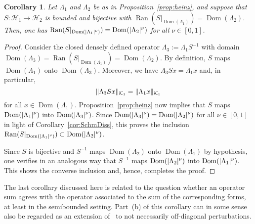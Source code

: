 \documentclass[11pt,a4paper]{amsart}
\numberwithin{equation}{section}
\DeclareMathOperator{\Ran}{Ran}
\DeclareMathOperator{\Dom}{Dom}
\DeclarePairedDelimiter{\abs}{|}{|}
\DeclarePairedDelimiter{\norm}{\lVert}{\rVert}
\newcommand{\cH}{{\mathcal H}}
\newcommand{\cK}{{\mathcal K}}
\theoremstyle{plain}
\newtheorem{corollary}[theorem]{Corollary}
\theoremstyle{definition}
\theoremstyle{remark}
\begin{document}
\begin{corollary}\label{cor:fracBij}
  Let $\Lambda_1$ and $\Lambda_2$ be as in Proposition~\ref{prop:heinz}, and suppose that $S\colon\cH_1\to\cH_2$ is bounded and
  bijective with $\Ran(S|_{\Dom(\Lambda_1)})=\Dom(\Lambda_2)$. Then, one has
  $\Ran(S|_{\Dom(\abs{\Lambda_1}^\nu)})=\Dom(\abs{\Lambda_2}^\nu)$ for all $\nu\in[0,1]$.
\end{corollary}

\begin{proof}
  Consider the closed densely defined operator $\Lambda_3 := \Lambda_1S^{-1}$ with domain
  $\Dom(\Lambda_3) = \Ran(S|_{\Dom(\Lambda_1)}) = \Dom(\Lambda_2)$. By definition, $S$ maps $\Dom(\Lambda_1)$ onto
  $\Dom(\Lambda_3)$. Moreover, we have $\Lambda_3 Sx = \Lambda_1 x$ and, in particular,
  \begin{equation*}
    \norm{ \Lambda_3 Sx }_{\cK_1} = \norm{\Lambda_1x}_{\cK_1}
  \end{equation*}
  for all $x\in\Dom(\Lambda_1)$. Proposition~\ref{prop:heinz} now implies that $S$ maps $\Dom(\abs{\Lambda_1}^\nu)$ into
  $\Dom(\abs{\Lambda_3}^\nu)$. Since $\Dom(\abs{\Lambda_3}^\nu)=\Dom(\abs{\Lambda_2}^\nu)$ for all $\nu \in [0,1]$ in light of
  Corollary~\ref{cor:SchmDiss}, this proves the inclusion $\Ran(S|_{\Dom(\abs{\Lambda_1}^\nu)})\subset\Dom(\abs{\Lambda_2}^\nu)$.

  Since $S$ is bijective and $S^{-1}$ maps $\Dom(\Lambda_2)$ onto $\Dom(\Lambda_1)$ by hypothesis, one verifies in an analogous
  way that $S^{-1}$ maps $\Dom(\abs{\Lambda_2}^\nu)$ into $\Dom(\abs{\Lambda_1}^\nu)$. This shows the converse inclusion and,
  hence, completes the proof.
\end{proof}%

The last corollary discussed here is related to the question whether an operator sum agrees with the operator associated to the
sum of the corresponding forms, at least in the semibounded setting. Part~(b) of this corollary can in some sense also be
regarded as an extension of~\cite[Lemma~2.2.7]{SchmDiss} to not necessarily off-diagonal perturbations.
\end{document}
